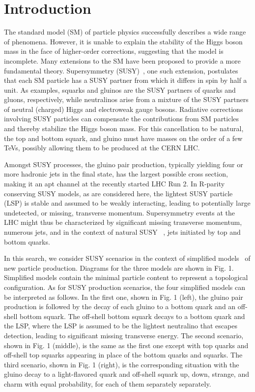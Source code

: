

\newpage



\section{Introduction}

The standard model (SM) of particle physics successfully describes a wide range of phenomena.
However, it is unable to explain the stability of the Higgs boson mass in the face of higher-order corrections, suggesting
that the model is incomplete. Many extensions to the SM have been proposed to provide a more
fundamental theory.  Supersymmetry (SUSY)~\cite{SUSYtheo}, one such extension, postulates that each
SM particle has a SUSY partner from which it differs in spin by half a unit.  As
examples, squarks and gluinos are the SUSY partners of quarks and gluons, respectively, while
neutralinos arise from a mixture of the SUSY partners of neutral (charged)
Higgs and electroweak gauge bosons. Radiative corrections involving SUSY particles can compensate the contributions from SM particles and thereby stabilize the Higgs boson mass.  For this cancellation to be natural, the top and bottom squark, and gluino must have
masses on the order of a few TeVs, possibly allowing them to be produced at the CERN
LHC.

Amongst SUSY processes,  the gluino pair production,  typically yielding four or more hadronic
jets in the final state, has the largest possible cross section, making it an apt channel at
 the recently started LHC Run 2. In R-parity ~\cite{RParity} conserving
SUSY models, as are considered here, the lightest SUSY particle (LSP) is stable and assumed
to be weakly interacting, leading to potentially large undetected, or missing, transverse momentum. Supersymmetry events at the LHC might thus be characterized by significant missing
transverse momentum, numerous jets, and in the context of natural SUSY ~\cite{Naturaln}, jets initiated
by top and bottom quarks.

In this search, we consider SUSY scenarios in the context of simplified models~\cite{SMS1} of new particle
production. Diagrams for the three models are shown in Fig. 1. Simplified models contain
the minimal particle content to represent a topological configuration. As for SUSY production
scenarios, the four simplified models can be interpreted as follows. In the first one, shown
in Fig. 1 (left), the gluino pair production is followed by the decay of each gluino to a bottom
quark and an off-shell bottom squark. The off-shell bottom squark decays to a bottom quark
and the LSP, where the LSP is assumed to be the lightest neutralino 
that escapes detection, leading to significant missing transverse energy. The second scenario, shown in Fig. 1 (middle), is the same as the first one except with top quarks and off-shell top squarks appearing in place of the bottom
quarks and squarks. The third scenario, shown in Fig. 1 (right), is the corresponding
situation with the gluino decay to a light-flavored quark and off-shell squark up, down, strange,
and charm with equal probability, for each of them separately separately. 

